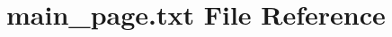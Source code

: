 \hypertarget{main__page_8txt}{}\section{main\+\_\+page.\+txt File Reference}
\label{main__page_8txt}
